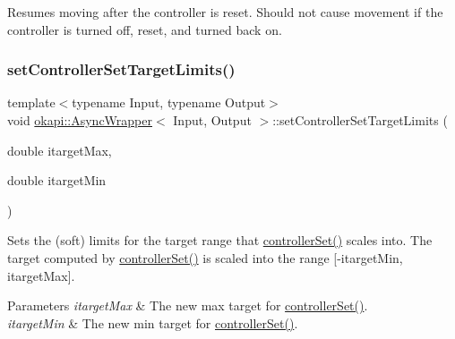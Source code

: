 Resumes moving after the controller is reset. Should not cause movement if the controller is turned off, reset, and turned back on. \mbox{\label{classokapi_1_1AsyncWrapper_a9cb3a50a27e7d3e1263ed3aa6c57bb82}} 
\subsubsection{\texorpdfstring{setControllerSetTargetLimits()}{setControllerSetTargetLimits()}}
{\footnotesize\ttfamily template$<$typename Input, typename Output$>$ \\
void \mbox{\hyperlink{classokapi_1_1AsyncWrapper}{okapi\+::\+Async\+Wrapper}}$<$ Input, Output $>$\+::set\+Controller\+Set\+Target\+Limits (\begin{DoxyParamCaption}\item[{double}]{itarget\+Max,  }\item[{double}]{itarget\+Min }\end{DoxyParamCaption})\hspace{0.3cm}{\ttfamily [inline]}}

Sets the (soft) limits for the target range that \mbox{\hyperlink{classokapi_1_1AsyncWrapper_aec6d1a4214bad2151bee23dc5e8076e7}{controller\+Set()}} scales into. The target computed by \mbox{\hyperlink{classokapi_1_1AsyncWrapper_aec6d1a4214bad2151bee23dc5e8076e7}{controller\+Set()}} is scaled into the range \mbox{[}-\/itarget\+Min, itarget\+Max\mbox{]}.


\begin{DoxyParams}{Parameters}
{\em itarget\+Max} & The new max target for \mbox{\hyperlink{classokapi_1_1AsyncWrapper_aec6d1a4214bad2151bee23dc5e8076e7}{controller\+Set()}}. \\
\hline
{\em itarget\+Min} & The new min target for \mbox{\hyperlink{classokapi_1_1AsyncWrapper_aec6d1a4214bad2151bee23dc5e8076e7}{controller\+Set()}}. \\
\hline
\end{DoxyParams}
\mbox{\label{classokapi_1_1AsyncWrapper_a668c83b4a2b5bee7f2d072b57157d19a}} 
